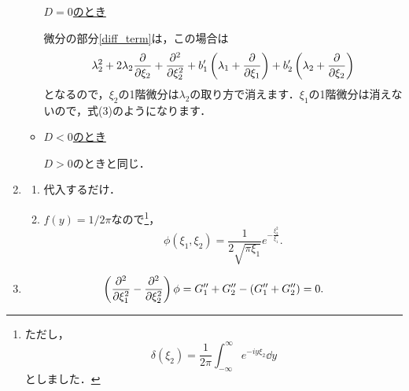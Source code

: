 \documentclass[a4paper,pdflatex,ja=standard]{bxjsarticle}
\begin{document}
\begin{enumerate}
\begin{itemize}
    \uline{$D=0$のとき}

    微分の部分\eqref{diff_term}は，この場合は
    \begin{equation}
      \lambda_2^2
      +
      2\lambda_2\pdv{}{\xi_2}
      +
      \pdv[2]{}{\xi_2}
      +
      b'_1\left( \lambda_1+\pdv{}{\xi_1} \right)
      +
      b'_2\left( \lambda_2+\pdv{}{\xi_2} \right)
    \end{equation}
    となるので，$\xi_2$の1階微分は$\lambda_2$の取り方で消えます．$\xi_1$の1階微分は消えないので，式(3)のようになります．


    \item 

    \uline{$D<0$のとき}

    $D>0$のときと同じ．


  \end{itemize}


  \item 

  \begin{enumerate}

    \item 

    代入するだけ．


    \item 

    $f(y)=1/2\pi$なので\footnote{
      ただし，
      $$
        \delta(\xi_2)
        =
        \frac{1}{2\pi}
        \int_{-\infty}^{\infty} e^{-iy\xi_2}
        \dd y 
      $$
      としました．
    }，
    \begin{equation}
      \phi(\xi_1,\xi_2)
      =
      \frac{1}{2\sqrt{\pi\xi_1}}
      e^{-\frac{\xi_2^2}{\xi_1}}
      .
    \end{equation}

  \end{enumerate}

  \item 

  \begin{equation}
    \left(  
      \pdv[2]{}{\xi_1}
      -
      \pdv[2]{}{\xi_2}    
    \right)
    \phi
    =
    G_1^{\prime\prime}
    +
    G_2^{\prime\prime}
    -
    \left(  
      G_1^{\prime\prime}
      +
      G_2^{\prime\prime}
    \right)
    =
    0
    .
  \end{equation}


\end{enumerate}



\clearpage
\end{document}
